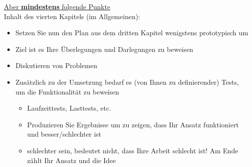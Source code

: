 \underline{Aber \textbf{mindestens} folgende Punkte}\\
Inhalt des vierten Kapitels (im Allgemeinen):
\begin{itemize}
    \item Setzen Sie nun den Plan aus dem dritten Kapitel wenigstens prototypisch um
    \item Ziel ist es Ihre Überlegungen und Darlegungen zu beweisen
    \item Diskutieren von Problemen
    \item Zusätzlich zu der Umsetzung bedarf es (von Ihnen zu definierender) Tests, um die Funktionalität zu beweisen
    \begin{itemize}
        \item Laufzeittests, Lasttests, etc.
        \item Produzieren Sie Ergebnisse um zu zeigen, dass Ihr Ansatz funktioniert und besser/schlechter ist
        \item \glqq schlechter\grqq{} sein, bedeutet nicht, dass Ihre Arbeit schlecht ist! Am Ende zählt Ihr Ansatz und die Idee
    \end{itemize}
\end{itemize}
